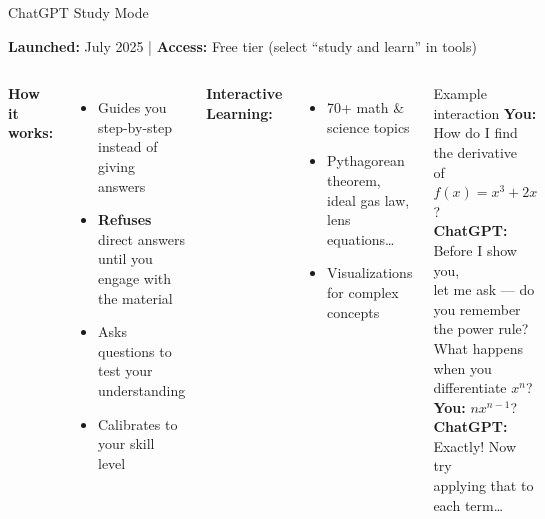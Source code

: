 \documentclass[aspectratio=169]{beamer}
\begin{document}
\begin{frame}{ChatGPT Study Mode}

\textbf{\color{popblue}Launched:} July 2025 \quad|\quad
\textbf{\color{popblue}Access:} Free tier (select ``study and learn'' in tools)

\bigskip
\begin{columns}[T]
\textbf{How it works:}
\begin{itemize}
  \item Guides you step-by-step instead of giving answers
  \item \textbf{Refuses} direct answers until you engage with the material
  \item Asks questions to test your understanding
  \item Calibrates to your skill level
\end{itemize}

\bigskip
\textbf{Interactive Learning:}
\begin{itemize}
  \item 70+ math \& science topics
  \item Pythagorean theorem, ideal gas law, lens equations\ldots
  \item Visualizations for complex concepts
\end{itemize}

\begin{block}{Example interaction}
\ttfamily\scriptsize
\textbf{You:} How do I find the derivative\\
of $f(x) = x^3 + 2x$?\\[4pt]
\textbf{ChatGPT:} Before I show you,\\
let me ask --- do you remember\\
the power rule? What happens\\
when you differentiate $x^n$?\\[4pt]
\textbf{You:} $nx^{n-1}$?\\[4pt]
\textbf{ChatGPT:} Exactly! Now try\\
applying that to each term\ldots
\end{block}
\end{columns}
\end{frame}
\end{document}
